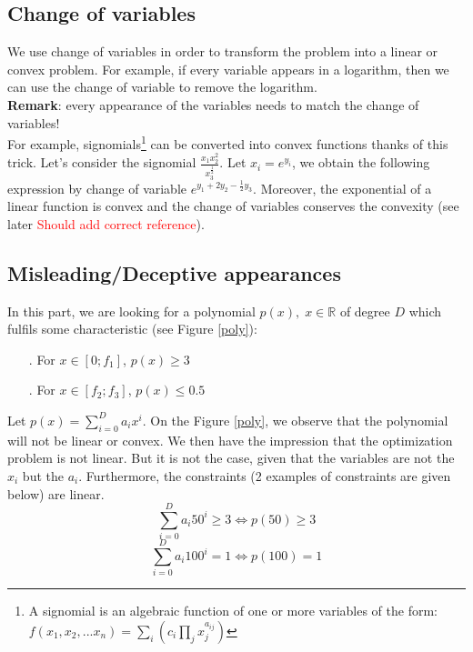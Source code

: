 \subsection{Change of variables}

We use change of variables in order to transform the problem into a linear or convex problem. For example, if every variable appears in a logarithm, then we can use the change of variable to remove the logarithm.\\ 
\textbf{Remark}: every appearance of the variables needs to match the change of variables! \\

For example, signomials\footnote{A signomial is an algebraic function of one or more variables of the form:\\ $f(x_1,x_2,...x_n) = \sum_i{(c_i\prod_j{x_j^{a_{ij}}})}$} can be converted into convex functions thanks of this trick. Let's consider the signomial $\frac{x_1x_2^2}{x_3^{\frac{1}{2}}}$. Let $x_i = e^{y_i}$, we obtain the following expression by change of variable $e^{y_1+2y_2-\frac{1}{2}y_3}$. Moreover, the exponential of a linear function is convex and the change of variables conserves the convexity (see later \textcolor{red}{Should add correct reference}).

\subsection{Misleading/Deceptive appearances}

In this part, we are looking for a polynomial $p(x), \; x \in \mathbb{R}$ of degree $D$ which fulfils some characteristic (see Figure \ref{poly}): 
\begin{itemize}
\item[.]{For $x \in \left[0;f_1\right]$, $p(x) \geq 3$}
\item[.]{For $x \in \left[f_2;f_3\right]$, $p(x) \leq 0.5$} \\
\end{itemize}

Let $p(x) = \sum_{i=0}^{D} a_i x^{i}$.
On the Figure \ref{poly}, we observe that the polynomial will not be linear or convex. We then have the impression that the optimization problem is not linear. But it is not the case, given that the variables are not the $x_i$ but the $a_i$.
Furthermore, the constraints (2 examples of constraints are given below) are linear. 
$$ \sum_{i=0}^{D} a_i 50^{i} \geq 3 \Leftrightarrow p(50) \geq 3$$
$$ \sum_{i=0}^{D} a_i 100^{i} = 1 \Leftrightarrow p(100)=1$$

